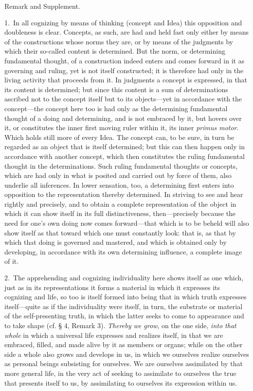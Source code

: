 \documentclass[12pt,a4paper]{book}
\begin{document}
\begin{center}Remark and Supplement.\end{center}
1.~In all cognizing by means of thinking (concept and Idea) this opposition and
doubleness is clear. Concepts, as such, are had and held fast only either by
means of the constructions whose norms they are, or by means of the judgments by
which their so-called content is determined. But the norm, or determining
fundamental thought, of a construction indeed enters and comes forward in it as
governing and ruling, yet is not itself constructed; it is therefore had only in
the living activity that proceeds from it. In judgments a concept is expressed,
in that its content is determined; but since this content is a sum of
determinations ascribed not to the concept itself but to its objects---yet in
accordance with the concept---the concept here too is had only as the determining
fundamental thought of a doing and determining, and is not embraced by it, but
hovers over it, or constitutes the inner first moving ruler within it, its inner
\textit{primus motor}. Which holds still more of every Idea. The concept can, to
be sure, in turn be regarded as an object that is itself determined; but this can
then happen only in accordance with another concept, which then constitutes the
ruling fundamental thought in the determinations. Such ruling fundamental
thoughts or concepts, which are had only in what is posited and carried out by
force of them, also underlie all inferences. In lower sensation, too, a
determining first enters into opposition to the representation thereby
determined. In striving to see and hear rightly and precisely, and to obtain a
complete representation of the object in which it can show itself in its full
distinctiveness, then---precisely because the need for one's own doing now comes
forward---that which is to be beheld will also show itself as that toward which
one must constantly look: that is, as that by which that doing is governed and
mastered, and which is obtained only by developing, in accordance with its own
determining influence, a complete image of it.

2.~The apprehending and cognizing individuality here shows itself as one which,
just as in its representations it forms a material in which it expresses its
cognizing and life, so too is itself formed into being that in which truth
expresses itself---quite as if the individuality were itself, in turn, the
substrate or material of the self-presenting truth, in which the latter seeks to
come to appearance and to take shape (cf. § 4, Remark 3). \emph{Thereby we grow},
on the one side, \emph{into that whole} in which a universal life expresses and
realizes itself, in that we are embraced, filled, and made alive by it as members
or organs; while on the other side a whole also grows and develops in us, in
which we ourselves realize ourselves as personal beings subsisting for ourselves.
We are ourselves assimilated by that more general life, in the very act of
seeking to assimilate to ourselves the true that presents itself to us, by
assimilating to ourselves its expression within us.
\end{document}
